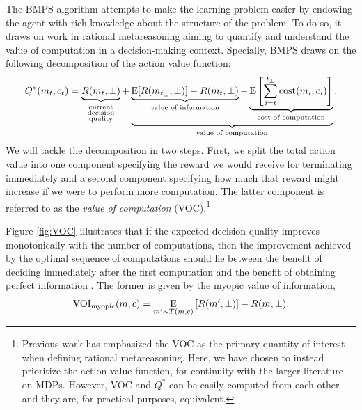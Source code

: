 The BMPS algorithm attempts to make the learning problem easier by endowing the agent with rich knowledge about the structure of the problem. To do so, it draws on work in rational metareasoning aiming to quantify and understand the value of computation \citep{matheson1968economic,horvitz1987reasoning,russell1991principles} in a decision-making context. Specially, BMPS draws on the following decomposition of the action value function:
%
\begin{equation}
  Q^*(m_t, c_t) = 
    \underbrace{R(m_t, \bot)
    }_{
      \substack{\text{current}\\ \text{decision}\\ \text{quality}}
    } +
    \underbrace{
      \underbrace{
        \E[R(m_{t_\bot}, \bot)] - R(m_t, \bot)
      }_{
        \text{value of information}
      } - 
      \underbrace{
        \E\left[\sum_{i=t}^{t_\bot} \cost(m_i, c_i) \right]
      }_{
        \text{cost of computation}
      }
    }_{
      \text{value of computation}
    }.
\end{equation}
%
We will tackle the decomposition in two steps. First, we split the total action value into one component specifying the reward we would receive for terminating immediately and a second component specifying how much that reward might increase if we were to perform more computation. The latter component is referred to as the \emph{value of computation} (VOC).\footnote{%
  Previous work has emphasized the VOC as the primary quantity of interest when defining rational metareasoning. Here, we have chosen to instead prioritize the action value function, for continuity with the larger literature on MDPs. However, VOC and $Q^*$ can be easily computed from each other and they are, for practical purposes, equivalent.
} 



Figure \ref{fig:VOC} illustrates that if the expected decision quality improves monotonically with the number of computations, then the improvement achieved by the optimal sequence of computations should lie between the benefit of deciding immediately after the first computation and the benefit of obtaining perfect information \cite{Howard1966}. The former is given by the myopic value of information,
%
\begin{equation*}
  \VOImy(m,c) = \expectunder{R(m', \bot)}{m' \sim T(m, c)} - R(m, \bot).
\end{equation*}


